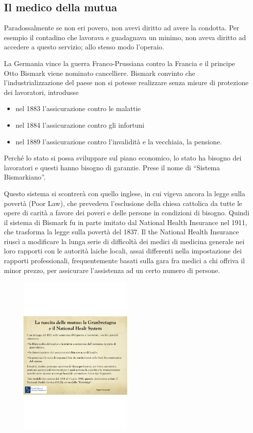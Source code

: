 \subsection{Il medico della mutua}

Paradossalmente se non eri povero, non avevi diritto ad avere la
condotta. Per esempio il contadino che lavorava e guadagnava un minimo,
non aveva diritto ad accedere a questo servizio; allo stesso modo
l'operaio.

La Germania vince la guerra Franco-Prussiana contro la Francia e il
principe Otto Bismark viene nominato cancelliere. Bismark convinto che
l'industrializzazione del paese non si potesse realizzare senza misure
di protezione dei lavoratori, introdusse
\begin{itemize}
\item nel 1883 l'assicurazione contro le malattie
\item nel 1884 l'assicurazione contro gli infortuni
\item nel 1889 l'assicurazione contro l'invalidità e la vecchiaia, la
pensione.
\end{itemize}

Perché lo stato si possa sviluppare sul piano economico, lo stato ha
bisogno dei lavoratori e questi hanno bisogno di garanzie. Prese il nome
di ``Sistema Bismarkiano''.

Questo sistema si scontrerà con quello inglese, in cui vigeva ancora la
legge sulla povertà (Poor Law), che prevedeva l'esclusione della chiesa
cattolica da tutte le opere di carità a favore dei poveri e delle
persone in condizioni di bisogno. Quindi il sistema di Bismark fu in
parte imitato dal National Health Insurance nel 1911, che trasforma la
legge sulla povertà del 1837. Il the National Health Insurance riuscì a
modificare la lunga serie di difficoltà dei medici di medicina generale
nei loro rapporti con le autorità laiche locali, assai differenti nella
impostazione dei rapporti professionali, frequentemente basati sulla
gara fra medici a chi offriva il minor prezzo, per assicurare
l'assistenza ad un certo numero di persone.

\begin{figure}[!ht]
\centering
	\includegraphics[width=0.5\textwidth]{38/image4.png}
	\end{figure}
	
